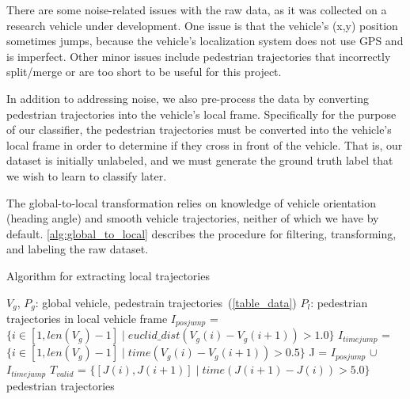 There are some noise-related issues with the raw data, as it was collected on a research vehicle under development.
One issue is that the vehicle's (x,y) position sometimes jumps, because the vehicle's localization system does not use GPS and is imperfect.
Other minor issues include pedestrian trajectories that incorrectly split/merge or are too short to be useful for this project.

In addition to addressing noise, we also pre-process the data by converting pedestrian trajectories into the vehicle's local frame.
Specifically for the purpose of our classifier, the pedestrian trajectories must be converted into the vehicle's local frame in order to determine if they cross in front of the vehicle.
That is, our dataset is initially unlabeled, and we must generate the ground truth label that we wish to learn to classify later.

The global-to-local transformation relies on knowledge of vehicle orientation (heading angle) and smooth vehicle trajectories, neither of which we have by default.
\cref{alg:global_to_local} describes the procedure for filtering, transforming, and labeling the raw dataset.

\begin{algorithm}\label{alg:global_to_local}
	\caption{Algorithm for extracting local trajectories}
	\begin{algorithmic}[1]
		\renewcommand{\algorithmicrequire}{\textbf{Input:}}
		\renewcommand{\algorithmicensure}{\textbf{Output:}}
		\REQUIRE $V_g$, $P_g$: global vehicle, pedestrain trajectories~(\cref{table_data})
		\ENSURE  $P_l$: pedestrian trajectories in local vehicle frame
			\STATE $I_{pos jump}$ = $\{i \in [1,len(V_g)-1] \mid euclid\_dist(V_g(i)-V_g(i+1))>1.0\}$
			\STATE $I_{time jump}$ = $\{i \in [1,len(V_g)-1] \mid time(V_g(i)-V_g(i+1))>0.5\}$
			\STATE J = $I_{pos jump}$ $\cup$ $I_{time jump}$
			\STATE $T_{valid}$ = $\{[J(i), J(i+1)] \mid time(J(i+1) - J(i)) > 5.0\}$
		\ENDFOR
		\RETURN pedestrian trajectories 
	\end{algorithmic} 
\end{algorithm}




